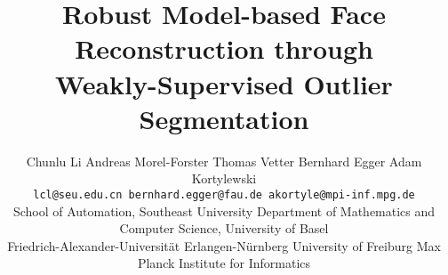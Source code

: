\documentclass[10pt,twocolumn,letterpaper]{article}
\begin{document}
\title{
 Robust Model-based Face Reconstruction 
through \\Weakly-Supervised Outlier Segmentation}


\author{ \normalsize{
Chunlu Li}
\quad
\normalsize{Andreas Morel-Forster} 
\quad
\normalsize{Thomas Vetter} 
\quad
\normalsize{Bernhard Egger}
\quad
\normalsize{Adam Kortylewski} \\
{\tt\small lcl@seu.edu.cn \quad \tt\small bernhard.egger@fau.de \quad \tt\small akortyle@mpi-inf.mpg.de}
\\
\normalsize{ School of Automation, Southeast University \quad  Department of Mathematics and Computer Science, University of Basel }\\ 
\normalsize{ Friedrich-Alexander-Universität Erlangen-Nürnberg \quad University of Freiburg \quad Max Planck Institute for Informatics  }
}
\end{document}
